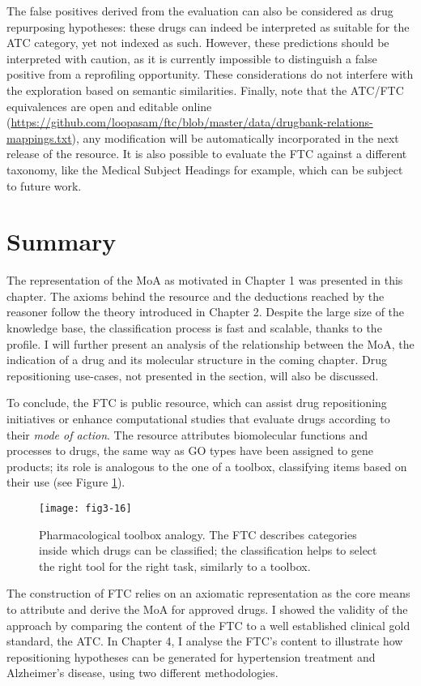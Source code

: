 The false positives derived from the evaluation can also be considered as drug repurposing hypotheses: these drugs can indeed be interpreted as suitable for the ATC category, yet not indexed as such. However, these predictions should be interpreted with caution, as it is currently impossible to distinguish a false positive from a reprofiling opportunity. These considerations do not interfere with the exploration based on semantic similarities. Finally, note that the ATC/FTC equivalences are open and editable online (\url{https://github.com/loopasam/ftc/blob/master/data/drugbank-relations-mappings.txt}), any modification will be automatically incorporated in the next release of the resource. It is also possible to evaluate the FTC against a different taxonomy, like the Medical Subject Headings for example, which can be subject to future work.

\section{Summary}
The representation of the MoA as motivated in Chapter 1 was presented in this chapter. The axioms behind the resource and the deductions reached by the reasoner follow the theory introduced in Chapter 2. Despite the large size of the knowledge base, the classification process is fast and scalable, thanks to the  profile. I will further present an analysis of the relationship between the MoA, the indication of a drug and its molecular structure in the coming chapter. Drug repositioning use-cases, not presented in the section, will also be discussed.

To conclude, the FTC is public resource, which can assist drug repositioning initiatives or enhance computational studies that evaluate drugs according to their \emph{mode of action}. The resource attributes biomolecular functions and processes to drugs, the same way as GO types have been assigned to gene products; its role is analogous to the one of a toolbox, classifying items based on their use (see Figure \ref{fig3-16}).

\begin{figure}[H]
    \centering
    \texttt{[image: fig3-16]}
    \caption{Pharmacological toolbox analogy. The FTC describes categories inside which drugs can be classified; the classification helps to select the right tool for the right task, similarly to a toolbox.}
    \label{fig3-16}
\end{figure}

The construction of FTC relies on an axiomatic representation as the core means to attribute and derive the MoA for approved drugs. I showed the validity of the approach by comparing the content of the FTC to a well established clinical gold standard, the ATC. In Chapter 4, I analyse the FTC's content to illustrate how repositioning hypotheses can be generated for hypertension treatment and Alzheimer's disease, using two different methodologies.

